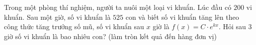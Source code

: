\begin{bt}%
	Trong một phòng thí nghiệm, người ta nuôi một loại vi khuẩn. Lúc đầu có $200$ vi khuẩn. Sau một giờ, số vi khuẩn là $525$ con và biết số vi khuẩn tăng lên theo công thức tăng trưởng số mũ, số vi khuẩn sau $x$ giờ là $f(x)=C\cdot e^{kx}$. Hỏi sau $3$ giờ số vi khuẩn là bao nhiêu con? (làm tròn kết quả đến hàng đơn vị)
\end{bt}

